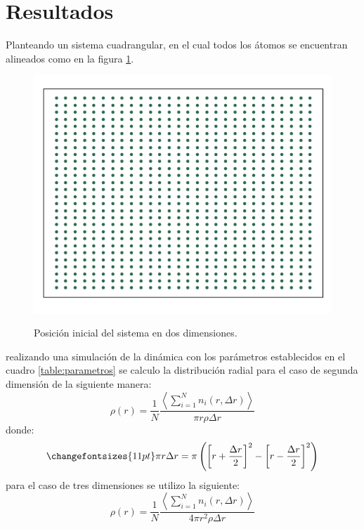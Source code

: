 \documentclass[reprint,amsmath,amssymb,aps,]{revtex4-2}
\begin{document}
\section{Resultados}
Planteando un sistema cuadrangular, en el cual todos los átomos se encuentran alineados como en la figura \ref{pos inicial}.
\begin{figure}[H]
    \hspace*{-0.5cm}
    \includegraphics[scale=0.4]{../Graphics/Cor_in.png}\\
    \caption{Posición inicial del sistema en dos dimensiones.}
    \label{pos inicial}
\end{figure}
realizando una simulación de la dinámica con los parámetros establecidos en el cuadro \ref{table:parametros} se calculo la distribución radial para el caso de segunda dimensión de la siguiente manera:
\begin{equation}
    \rho(r) = \frac{1}{N} \frac{\left\langle \sum_{i=1}^N n_i(r,\Delta r)  \right\rangle}{\pi r \rho \Delta r}
    \label{eq:rhor}
\end{equation}
donde:
\begin{equation}
    \changefontsizes{11pt}
    \label{eq:area}
    \pi r \Delta r = \pi \left(\left[r +\frac{\Delta r}{2}\right]^2 - \left[r- \frac{\Delta r}{2} \right]^2 \right)
\end{equation}
para el caso de tres dimensiones se utilizo la siguiente:
\begin{equation}
    \rho(r) = \frac{1}{N} \frac{\left\langle \sum_{i=1}^N n_i(r,\Delta r)  \right\rangle}{ 4\pi r^2 \rho \Delta r}
    \label{eq:rhor3}
\end{equation}
\end{document}

